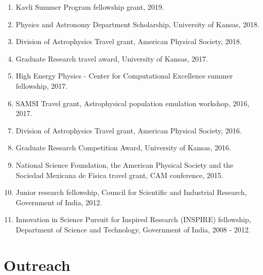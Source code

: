 \documentclass[letterpaper]{article}
\begin{document}
\begin{enumerate}


\item Kavli Summer Program fellowship grant, 2019. 

\item Physics and Astronomy Department Scholarship, University of Kansas, 2018. 

\item Division of Astrophysics Travel grant, American Physical Society, 2018. 

\item Graduate Research travel award, University of Kansas, 2017.

\item High Energy Physics - Center for Computational Excellence summer fellowship, 2017.

\item SAMSI Travel grant, Astrophysical population emulation workshop, 2016, 2017.

\item Division of Astrophysics Travel grant, American Physical Society, 2016. 


\item Graduate Research Competition Award, University of Kansas, 2016.

\item National Science Foundation, the American Physical Society and the Sociedad Mexicana de Fisica travel grant, CAM conference, 2015.

\item Junior research fellowship, Council for Scientific and Industrial Research, Government of India, 2012.

\item Innovation in Science Pursuit for Inspired Research (INSPIRE) fellowship, Department of Science and Technology, Government of India, 2008 - 2012.

\end{enumerate}

\section*{Outreach}
\end{document}
